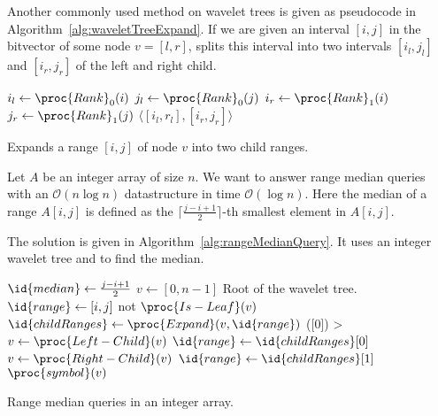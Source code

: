 Another commonly used method on wavelet trees is  given as pseudocode in Algorithm~\ref{alg:waveletTreeExpand}. If we are given an interval $[i,j]$ in the bitvector of some node $v=[l,r]$,  splits this interval into two intervals $[i_l,j_l]$ and $[i_r,j_r]$ of the left and right child.

\begin{algorithm}[htb]
  \begin{codebox}
    \li $i_l \gets \proc{Rank}_0(i)$
    \li $j_l \gets \proc{Rank}_0(j)$
    \li $i_r \gets \proc{Rank}_1(i)$
    \li $j_r \gets \proc{Rank}_1(j)$
    \li \Return $\langle [i_l,r_l], [i_r,j_r] \rangle$
  \end{codebox}
  \caption{Expands a range $[i,j]$ of node $v$ into two child ranges.}
  \label{alg:waveletTreeExpand}
\end{algorithm}

\begin{Example}
  Let $A$ be an integer array of size $n$. We want to answer range median queries with an $\mathcal{O}(n\log n)$ datastructure in time $\mathcal{O}(\log n)$. Here the median of a range $A[i,j]$ is defined as the $\lceil \frac{j - i + 1}{2} \rceil$-th smallest element in $A[i,j]$.

  The solution is given in Algorithm~\ref{alg:rangeMedianQuery}. It uses an integer wavelet tree and  to find the median.
  \begin{algorithm}[htb]
    \begin{codebox}
      \li $\id{median} \gets \frac{j - i + 1}{2}$
      \li $v \gets [0,n-1]$ \>\>\>\>\>\>\>\>\Comment Root of the wavelet tree.
      \li $\id{range} \gets [i,j]$
      \li \While not $\proc{Is-Leaf}(v)$
          \Do
      \li   $\id{childRanges} \gets \proc{Expand}(v, \id{range})$
      \li   \If {}([0]) > 
            \Then
      \li     $v \gets \proc{Left-Child}(v)$
      \li     $\id{range} \gets \id{childRanges}[0]$
      \li   \Else
      \li     $v \gets \proc{Right-Child}(v)$
      \li     $\id{range} \gets \id{childRanges}[1]$
            \End
          \End
      \li \Return $\proc{symbol}(v)$
    \end{codebox}
    \caption{Range median queries in an integer array.}
    \label{alg:rangeMedianQuery}
  \end{algorithm}
\end{Example}

